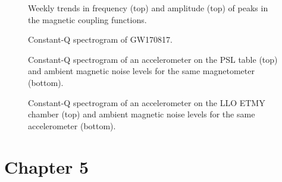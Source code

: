 \documentclass[11pt]{article}
\begin{document}
\begin{figure}
	\centering
	\caption{Weekly trends in frequency (top) and amplitude (top) of peaks in the magnetic coupling functions.}
	\label{fig:weekly-mag-variation}
\end{figure}

\begin{figure}
	\centering
	\caption{Constant-Q spectrogram of GW170817.}
	\label{fig:vetting_gw170817_spectrogram}
\end{figure}

\begin{figure}
	\centering
	\caption{Constant-Q spectrogram of an accelerometer on the PSL table (top) and ambient magnetic noise levels for the same magnetometer (bottom).}
	\label{fig:vetting_gw170817_lho}
\end{figure}

\begin{figure}
	\centering
	\caption{Constant-Q spectrogram of an accelerometer on the LLO ETMY chamber (top) and ambient magnetic noise levels for the same accelerometer (bottom).}
	\label{fig:vetting_gw170817_llo}
\end{figure}

\section{Chapter 5}
\end{document}

